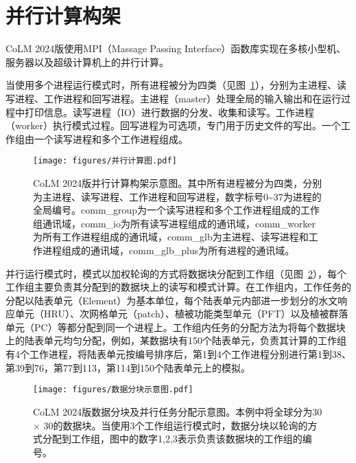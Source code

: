 \section{并行计算构架}\label{ch_parallel}

CoLM 2024版使用MPI（Massage Passing Interface）函数库实现在多核小型机、服务器以及超级计算机上的并行计算。

当使用多个进程运行模式时，所有进程被分为四类（见图~\ref{fig:fig_parallelization}），分别为主进程、读写进程、工作进程和回写进程。主进程（master）处理全局的输入输出和在运行过程中打印信息。读写进程（IO）进行数据的分发、收集和读写。工作进程（worker）执行模式过程。回写进程为可选项，专门用于历史文件的写出。一个工作组由一个读写进程和多个工作进程组成。

\begin{figure}[htpb]
    \centering
    \texttt{[image: figures/并行计算图.pdf]}
    \caption{CoLM 2024版并行计算构架示意图。其中所有进程被分为四类，分别为主进程、读写进程、工作进程和回写进程，数字标号0\textasciitilde 37为进程的全局编号。comm\_group为一个读写进程和多个工作进程组成的工作组通讯域，comm\_io为所有读写进程组成的通讯域，comm\_worker为所有工作进程组成的通讯域，comm\_glb为主进程、读写进程和工作进程组成的通讯域，comm\_glb\_plus为所有进程的通讯域。}
    \label{fig:fig_parallelization}
\end{figure}

并行运行模式时，模式以加权轮询的方式将数据块分配到工作组（见图~\ref{fig:fig_block}），每个工作组主要负责其分配到的数据块上的读写和模式计算。在工作组内，工作任务的分配以陆表单元（Element）为基本单位，每个陆表单元内部进一步划分的水文响应单元（HRU）、次网格单元（patch）、植被功能类型单元（PFT）以及植被群落单元（PC）等都分配到同一个进程上。工作组内任务的分配方法为将每个数据块上的陆表单元均匀分配，例如，某数据块有150个陆表单元，负责其计算的工作组有4个工作进程，将陆表单元按编号排序后，第1到4个工作进程分别进行第1到38、第39到76，第77到113，第114到150个陆表单元上的模拟。

\begin{figure}[htpb]
    \centering
    \texttt{[image: figures/数据分块示意图.pdf]}
    \caption{CoLM 2024版数据分块及并行任务分配示意图。本例中将全球分为30\textdegree$\times$ 30\textdegree 的数据块。当使用3个工作组运行模式时，数据分块以轮询的方式分配到工作组，图中的数字1,2,3表示负责该数据块的工作组的编号。}
    \label{fig:fig_block}
\end{figure}

